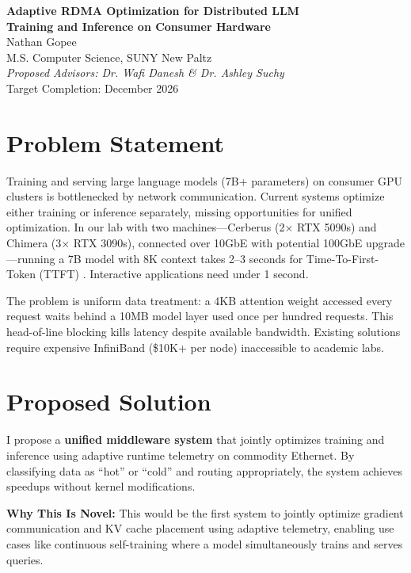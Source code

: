 \documentclass[10pt,letterpaper]{article}
\begin{document}
\begin{center}
{\LARGE \textbf{Adaptive RDMA Optimization for Distributed LLM\\Training and Inference on Consumer Hardware}}\\[8pt]
{\large Nathan Gopee}\\
M.S. Computer Science, SUNY New Paltz\\
\textit{Proposed Advisors: Dr. Wafi Danesh \& Dr. Ashley Suchy}\\
Target Completion: December 2026
\end{center}

\section{Problem Statement}

Training and serving large language models (7B+ parameters) on consumer GPU clusters is bottlenecked by network communication. Current systems optimize either training or inference separately, missing opportunities for unified optimization. In our lab with two machines---Cerberus (2$\times$ RTX 5090s) and Chimera (3$\times$ RTX 3090s), connected over 10GbE with potential 100GbE upgrade---running a 7B model with 8K context takes 2--3 seconds for Time-To-First-Token (TTFT) \cite{nvidia-nim}. Interactive applications need under 1 second.

The problem is uniform data treatment: a 4KB attention weight accessed every request waits behind a 10MB model layer used once per hundred requests. This head-of-line blocking kills latency despite available bandwidth. Existing solutions require expensive InfiniBand (\$10K+ per node) inaccessible to academic labs.

\section{Proposed Solution}

I propose a \textbf{unified middleware system} that jointly optimizes training and inference using adaptive runtime telemetry on commodity Ethernet. By classifying data as ``hot'' or ``cold'' and routing appropriately, the system achieves speedups without kernel modifications.

\textbf{Why This Is Novel:} This would be the first system to jointly optimize gradient communication and KV cache placement using adaptive telemetry, enabling use cases like continuous self-training where a model simultaneously trains and serves queries.
\end{document}
